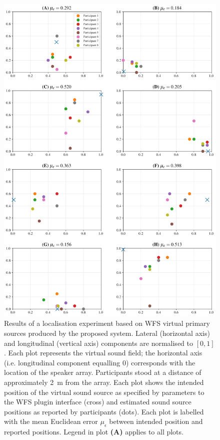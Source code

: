 \documentclass[utf8]{FrontiersinHarvard}
\begin{document}
    \begin{figure}[h!]
        \centering
        \includegraphics[width=.74\textwidth]{figures/subjective}
        \caption{
            Results of a localisation experiment based on WFS virtual primary
            sources produced by the proposed system.
            Lateral (horizontal axis) and longitudinal (vertical axis)
            components are normalised to $[0, 1]$.
            Each plot represents the virtual sound field; the horizontal axis
            (i.e. longitudinal component equalling 0) corresponds with the
            location of the speaker array.
            Participants stood at a distance of approximately \qty{2}{\m} from
            the array.
            Each plot shows the intended position of the virtual sound source as
            specified by parameters to the WFS plugin interface (cross) and
            estimated sound source positions as reported by participants (dots).
            Each plot is labelled with the mean Euclidean error $\mu_\epsilon$
            between intended position and reported positions.
            Legend in plot \textbf{(A)} applies to all plots.
        }
        \label{fig:perceptual}
    \end{figure}
\end{document}
